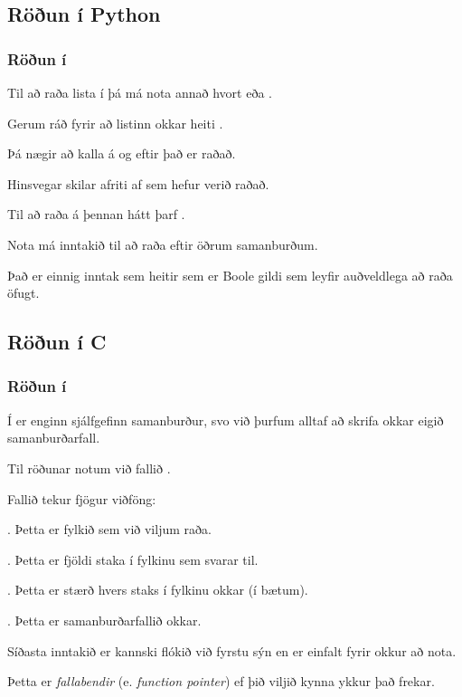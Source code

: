 \subsection{Röðun í Python}
{
    \frametitle{Röðun í }
    {
        \item<1-> Til að raða lista í  þá má nota annað hvort  eða .
        \item<2-> Gerum ráð fyrir að listinn okkar heiti .
        \item<3-> Þá nægir að kalla á  og eftir það er  raðað.
        \item<4-> Hinsvegar skilar  afriti af  sem hefur verið raðað.
        \item<5-> Til að raða  á þennan hátt þarf .
        \item<6-> Nota má inntakið  til að raða eftir öðrum samanburðum.
        \item<7-> Það er einnig inntak sem heitir  sem er Boole gildi sem leyfir auðveldlega að raða öfugt.
    }
}

\subsection{Röðun í C}
{
    \frametitle{Röðun í }
    {
        \item<1-> Í  er enginn sjálfgefinn samanburður, svo við þurfum alltaf að skrifa okkar eigið samanburðarfall.
        \item<2-> Til röðunar notum við fallið .
        \item<3-> Fallið tekur fjögur viðföng:
        {
            \item<4-> . Þetta er fylkið sem við viljum raða.
            \item<5-> . Þetta er fjöldi staka í fylkinu sem  svarar til.
            \item<6-> . Þetta er stærð hvers staks í fylkinu okkar (í bætum).
            \item<7-> . Þetta er samanburðarfallið okkar.
        }
        \item<8-> Síðasta inntakið er kannski flókið við fyrstu sýn en er einfalt fyrir okkur að nota.
        \item<9-> Þetta er \emph{fallabendir} (e. \emph{function pointer}) ef þið viljið kynna ykkur það frekar.
    }
}

